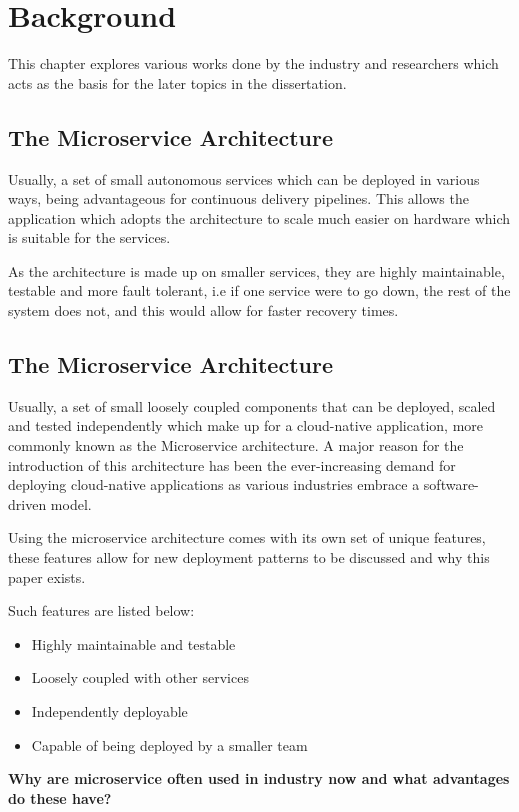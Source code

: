 \chapter{Background}\label{chap:background}
This chapter explores various works done by the industry and researchers which acts as the basis for the later topics in the dissertation. 

\section{The Microservice Architecture}
Usually, a set of small autonomous services which can be deployed in various ways, being advantageous for continuous delivery pipelines.  This allows the application which adopts the architecture to scale much easier on hardware which is suitable for the services. 

As the architecture is made up on smaller services, they are highly maintainable, testable and more fault tolerant, i.e if one service were to go down, the rest of the system does not, and this would allow for faster recovery times.  


\section{The Microservice Architecture}
Usually, a set of small loosely coupled components that can be deployed, scaled and tested independently which make up for a cloud-native application, more commonly known as the Microservice architecture. A major reason for the introduction of this architecture has been the ever-increasing demand for deploying cloud-native applications as various industries embrace a software-driven model. 

Using the microservice architecture comes with its own set of unique features, these features allow for new deployment patterns to be discussed and why this paper exists. 

Such features are listed below: 

\begin{itemize}
    \item Highly maintainable and testable 
    \item Loosely coupled with other services 
    \item Independently deployable 
    \item Capable of being deployed by a smaller team
\end{itemize}

\textbf{Why are microservice often used in industry now and what advantages do these have?}

